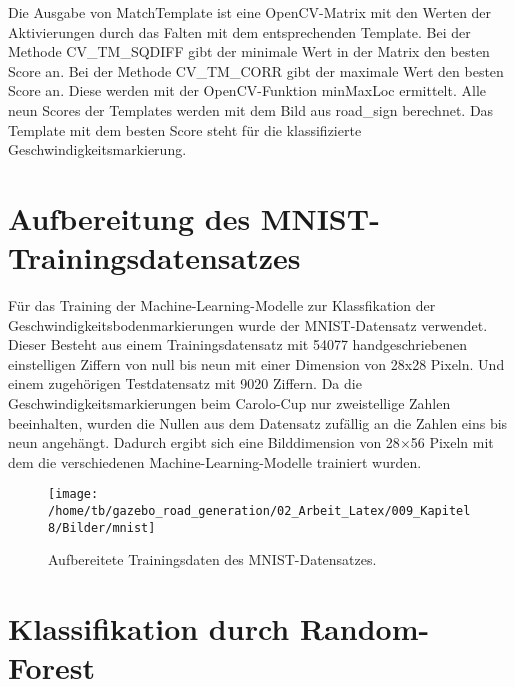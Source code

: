 Die Ausgabe von MatchTemplate ist eine OpenCV-Matrix mit den Werten der Aktivierungen durch das Falten mit dem entsprechenden Template.
Bei der Methode CV\_TM\_SQDIFF gibt der minimale Wert in der Matrix den besten Score an. Bei der Methode CV\_TM\_CORR gibt der maximale Wert den besten Score an. Diese werden mit der OpenCV-Funktion minMaxLoc ermittelt.
Alle neun Scores der Templates werden mit dem Bild aus road\_sign berechnet.
Das Template mit dem besten Score steht f{\"u}r die klassifizierte Geschwindigkeitsmarkierung. 

\newpage

\section{Aufbereitung des MNIST-Trainingsdatensatzes}
\label{sec:Aufbereitung des MNIST-Trainingsdatensatzes}

F{\"u}r das Training der Machine-Learning-Modelle zur Klassfikation der Geschwindigkeitsbodenmarkierungen wurde der MNIST-Datensatz verwendet.
Dieser Besteht aus einem Trainingsdatensatz mit 54077 handgeschriebenen einstelligen Ziffern von null bis neun mit einer Dimension von 28x28 Pixeln. Und einem zugeh{\"o}rigen Testdatensatz mit 9020 Ziffern.
Da die Geschwindigkeitsmarkierungen beim Carolo-Cup nur zweistellige Zahlen beeinhalten, wurden die Nullen aus dem Datensatz zuf{\"a}llig an die Zahlen eins bis neun angeh{\"a}ngt. Dadurch ergibt sich eine Bilddimension von 28$\times$56 Pixeln mit dem die verschiedenen Machine-Learning-Modelle trainiert wurden.

\begin{figure}[H]
\begin{center}
  \texttt{[image: /home/tb/gazebo\_road\_generation/02\_Arbeit\_Latex/009\_Kapitel8/Bilder/mnist]}%
  \caption[Aufbereitete Features des MNIST-Datensatzes]%
           {\label{fig:Aufbereitete Features des MNIST-Datensatzes}%
           Aufbereitete Trainingsdaten des MNIST-Datensatzes.
           }
\end{center}
\end{figure}

\section{Klassifikation durch Random-Forest}
\label{sec:Klassifikation durch Random-Forest}

